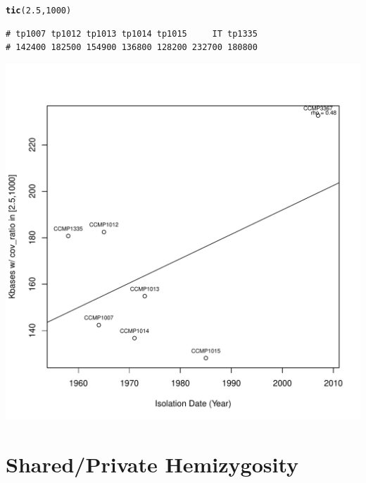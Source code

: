 \documentclass{article}\usepackage[]{graphicx}\usepackage[]{color}
\makeatletter
\def\maxwidth{ %
  \ifdim\Gin@nat@width>\linewidth
    \linewidth
  \else
    \Gin@nat@width
  \fi
}
\newcommand{\hlnum}[1]{\textcolor[rgb]{0.686,0.059,0.569}{#1}}%
\newcommand{\hlstd}[1]{\textcolor[rgb]{0.345,0.345,0.345}{#1}}%
\newcommand{\hlkwd}[1]{\textcolor[rgb]{0.737,0.353,0.396}{\textbf{#1}}}%
\newenvironment{kframe}{%
 \def\at@end@of@kframe{}%
 \ifinner\ifhmode%
  \def\at@end@of@kframe{\end{minipage}}%
  \begin{minipage}{\columnwidth}%
 \fi\fi%
 \def\FrameCommand##1{\hskip\@totalleftmargin \hskip-\fboxsep
 \colorbox{shadecolor}{##1}\hskip-\fboxsep
     \hskip-\linewidth \hskip-\@totalleftmargin \hskip\columnwidth}%
 \MakeFramed {\advance\hsize-\width
   \@totalleftmargin\z@ \linewidth\hsize
   \@setminipage}}%
 {\par\unskip\endMakeFramed%
 \at@end@of@kframe}
\newenvironment{knitrout}{}{} %
\makeatother
\begin{document}
\begin{knitrout}\footnotesize
{}\color{fgcolor}\begin{kframe}
\begin{alltt}
\hlkwd{tic}\hlstd{(}\hlnum{2.5}\hlstd{,}\hlnum{1000}\hlstd{)}
\end{alltt}
\begin{verbatim}
# tp1007 tp1012 tp1013 tp1014 tp1015     IT tp1335 
# 142400 182500 154900 136800 128200 232700 180800
\end{verbatim}
\end{kframe}

{\centering \includegraphics[width=\maxwidth]{figs-knitr/tripleup-1} 

}



\end{knitrout}

\section{Shared/Private Hemizygosity}
\end{document}
